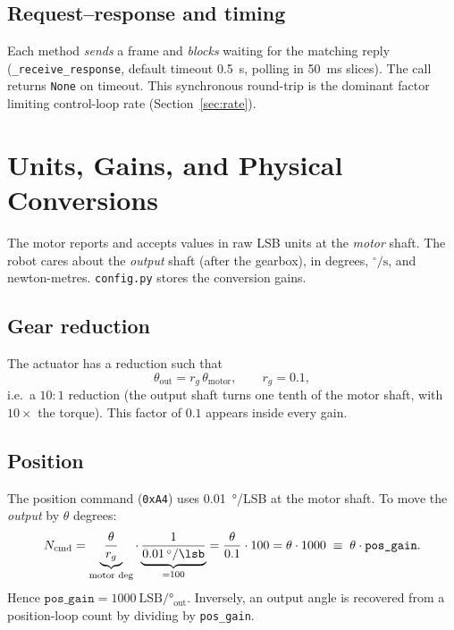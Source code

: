 \documentclass[11pt,a4paper]{article}
\newcommand{\dps}{\ensuremath{^\circ/\mathrm{s}}}
\newcommand{\code}[1]{\texttt{#1}}
\begin{document}
\subsection{Request--response and timing}
Each method \emph{sends} a frame and \emph{blocks} waiting for the matching
reply (\code{\_receive\_response}, default timeout \SI{0.5}{\second}, polling in
\SI{50}{\milli\second} slices). The call returns \code{None} on timeout. This
synchronous round-trip is the dominant factor limiting control-loop rate
(Section~\ref{sec:rate}).

\section{Units, Gains, and Physical Conversions}
\label{sec:gains}

The motor reports and accepts values in raw LSB units at the \emph{motor} shaft.
The robot cares about the \emph{output} shaft (after the gearbox), in degrees,
\dps{}, and newton-metres. \code{config.py} stores the conversion gains.

\subsection{Gear reduction}
The actuator has a reduction such that
\begin{equation}
  \theta_{\text{out}} = r_g\,\theta_{\text{motor}}, \qquad r_g = 0.1,
\end{equation}
i.e.\ a $10:1$ reduction (the output shaft turns one tenth of the motor shaft,
with $10\times$ the torque). This factor of $0.1$ appears inside every gain.

\subsection{Position}
The position command (\texttt{0xA4}) uses \SI{0.01}{\degree}/LSB at the motor
shaft. To move the \emph{output} by $\theta$ degrees:
\begin{equation}
  N_{\text{cmd}}
   = \underbrace{\frac{\theta}{r_g}}_{\text{motor deg}}
     \cdot \underbrace{\frac{1}{\SI{0.01}{\degree\per\lsb}}}_{=100}
   = \frac{\theta}{0.1}\cdot 100
   = \theta \cdot 1000
   \;\equiv\; \theta \cdot \texttt{pos\_gain}.
\end{equation}
Hence $\boxed{\texttt{pos\_gain} = 1000\ \text{LSB}/\si{\degree}_{\text{out}}}$.
Inversely, an output angle is recovered from a position-loop count by dividing by
\code{pos\_gain}.
\end{document}
